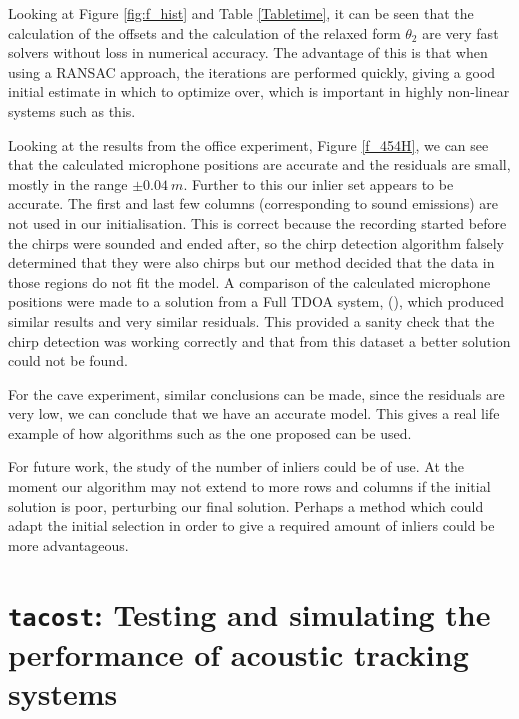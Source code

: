 \documentclass[
]{book}
\begin{document}
Looking at Figure \ref{fig:f_hist} and Table \ref{Tabletime}, it can be seen that the calculation of the offsets and the calculation of the relaxed form \(\theta_2\) are very fast solvers without loss in numerical accuracy. The advantage of this is that when using a RANSAC approach, the iterations are performed quickly, giving a good initial estimate in which to optimize over, which is important in highly
non-linear systems such as this.

Looking at the results from the office experiment, Figure \ref{f_454H}, we can see that the calculated microphone positions are accurate and the residuals are small, mostly in the range \(\pm 0.04~m\). Further to this our inlier set appears to be accurate. The first and last few columns (corresponding to sound emissions) are not used in our initialisation. This is correct because the recording started before the chirps were sounded and ended after, so the chirp detection algorithm falsely determined that they were also chirps but our method decided that the data in those regions do not fit the model. A comparison of the calculated microphone positions were made to a solution from a Full TDOA system, (\cite{kuang2013stratified}), which produced similar results and very similar residuals. This provided a sanity check that the chirp detection was working correctly and that from this dataset a better solution could not be found.

For the cave experiment, similar conclusions can be made, since the residuals are very low, we can conclude that we have an accurate model. This gives a real life example of how algorithms such as the one proposed can be used.

For future work, the study of the number of inliers could be of use. At the moment our algorithm may not extend to more rows and columns if the initial solution is poor, perturbing our final solution. Perhaps a method which could adapt the initial selection in order to give a required amount of inliers could be more advantageous.

\hypertarget{tacostchapter}{%
\chapter{\texorpdfstring{\texttt{tacost}: Testing and simulating the performance of acoustic tracking systems}{tacost: Testing and simulating the performance of acoustic tracking systems}}\label{tacostchapter}}

\end{document}
